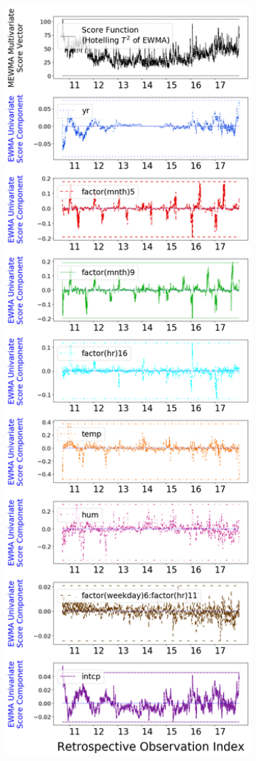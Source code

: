 \documentclass[twoside,11pt]{article}
\begin{document}
\begin{figure}[H]
\centering
    \begin{subfigure}[t]{0.35\linewidth}
     \centering
         \includegraphics[width=1.0\textwidth, trim=.0in .0in .0in .0in, clip]{../figures/v14/bike_sharing/reg_lin_A/quadr/PII_neg_single_retro_bike_fisher_mlines_with_regu_1e-08_0_0001_0_01_99_99.png}

\end{subfigure}
\end{figure}
\end{document}
